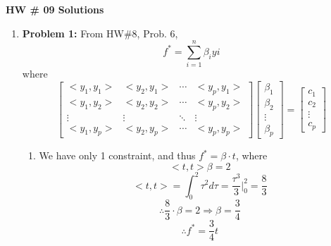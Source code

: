 \documentclass[letterpaper]{article}
\begin{document}
\newcommand{\trace}{\mathrm{trace}}
\newcommand{\real}{\mathbb R}  %
\newcommand{\nat}{\mathbb R}   %
\newcommand{\cp}{\mathbb C}    %
\newcommand{\ds}{\displaystyle}
\newcommand{\mf}[2]{\frac{\ds #1}{\ds #2}}
\newcommand{\book}[2]{{Luenberger, Page~#1, }{Prob.~#2}}
\newcommand{\spanof}[1]{\textrm{span} \{ #1 \}}
\parindent 0pt


\begin{center}
{\large \bf HW \# 09 Solutions}
\end{center}

\vspace*{1cm}

\begin{enumerate}
\item \noindent \textbf{Problem 1:} From HW\#8, Prob. 6,
$$ f^{*}=\sum_{i=1}^{n} \beta_{i} y{i}$$
where
$$ \left[\begin{array}{cccc}  <y_1, y_1>&    <y_2, y_1> & \cdots &  <y_p, y_1>\\    <y_1, y_2>&  <y_2, y_2> & \cdots &  <y_p, y_2>
\\
\vdots&   \vdots & \ddots &  \vdots
\\
<y_1, y_p>&    <y_2, y_p> & \cdots &  <y_p, y_p>\end{array} \right]  \left[\begin{array}{c} \beta_1 \\ \beta_2 \\ \vdots \\ \beta_p\end{array} \right] =  \left[\begin{array}{c} c_1 \\c_2 \\ \vdots \\ c_p \end{array} \right] $$
\begin{enumerate}
\setlength{\itemsep}{.1in}
\renewcommand{\labelenumi}{(\alph{enumi})}
\item We have only 1 constraint, and thus $f^{*}=\beta \cdot t$, where
$$<t,t>\beta = 2$$
$$<t,t>=\int_0^{2}\tau^{2}d \tau = \frac{\tau^{3}}{3}\Big|_{0}^2=\frac{8}{3}$$
$$\therefore \frac{8}{3} \cdot \beta = 2 \Rightarrow \beta = \frac{3}{4}$$
$$\therefore \boxed{f^{*} = \frac{3}{4} t}$$


\end{enumerate}
\end{enumerate}
\end{document}
